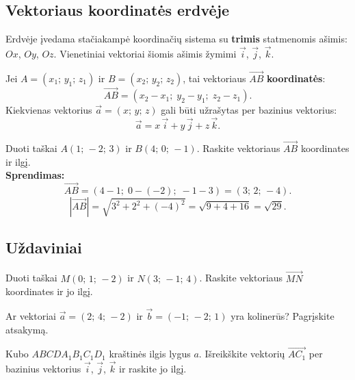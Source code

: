 \subsection{Vektoriaus koordinatės erdvėje}

Erdvėje įvedama stačiakampė koordinačių sistema su \textbf{trimis} statmenomis ašimis: 
$Ox$, $Oy$, $Oz$. Vienetiniai vektoriai šiomis ašimis žymimi $\vec{i}$, $\vec{j}$, 
$\vec{k}$.

\begin{definition}
Jei $A = (x_1;\, y_1;\, z_1)$ ir $B = (x_2;\, y_2;\, z_2)$, tai vektoriaus 
$\overrightarrow{AB}$ \textbf{koordinatės}:
\[
    \overrightarrow{AB} = (x_2 - x_1;\; y_2 - y_1;\; z_2 - z_1).
\]
Kiekvienas vektorius $\vec{a} = (x;\, y;\, z)$ gali būti užrašytas per bazinius vektorius:
\[
    \vec{a} = x\,\vec{i} + y\,\vec{j} + z\,\vec{k}.
\]
\end{definition}

\begin{example}
Duoti taškai $A(1;\,-2;\,3)$ ir $B(4;\,0;\,-1)$. Raskite vektoriaus $\overrightarrow{AB}$ 
koordinates ir ilgį.\\[4pt]
\textbf{Sprendimas:}
\[
    \overrightarrow{AB} = (4-1;\; 0-(-2);\; -1-3) = (3;\, 2;\, -4).
\]
\[
    |\overrightarrow{AB}| = \sqrt{3^2 + 2^2 + (-4)^2} = \sqrt{9 + 4 + 16} = \sqrt{29}.
\]
\end{example}

\subsection{Uždaviniai}

\begin{exercise}
Duoti taškai $M(0;\,1;\,-2)$ ir $N(3;\,-1;\,4)$. 
Raskite vektoriaus $\overrightarrow{MN}$ koordinates ir jo ilgį.
\end{exercise}

\begin{exercise}
Ar vektoriai $\vec{a} = (2;\,4;\,-2)$ ir $\vec{b} = (-1;\,-2;\,1)$ yra kolinerūs? 
Pagrįskite atsakymą.
\end{exercise}

\begin{exercise}
Kubo $ABCDA_1B_1C_1D_1$ kraštinės ilgis lygus $a$. Išreikškite vektorių 
$\overrightarrow{AC_1}$ per bazinius vektorius $\vec{i}$, $\vec{j}$, $\vec{k}$ ir 
raskite jo ilgį.
\end{exercise}

